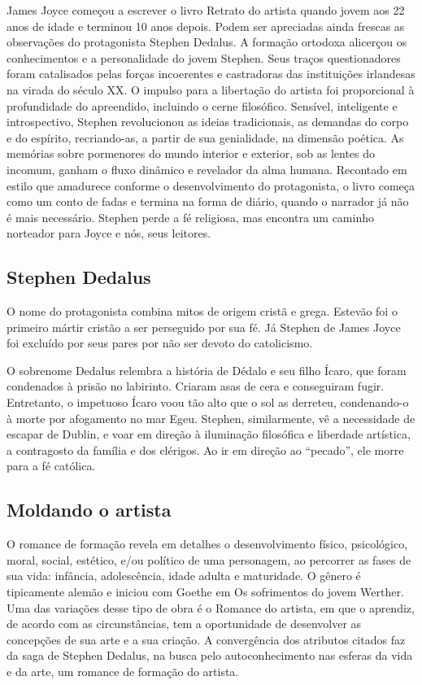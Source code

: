 James Joyce começou a escrever o livro Retrato do artista quando jovem
aos 22 anos de idade e terminou 10 anos depois. Podem ser apreciadas
ainda frescas as observações do protagonista Stephen Dedalus. A formação
ortodoxa alicerçou os conhecimentos e a personalidade do jovem Stephen.
Seus traços questionadores foram catalisados pelas forças incoerentes e
castradoras das instituições irlandesas na virada do século XX. O
impulso para a libertação do artista foi proporcional à profundidade do
apreendido, incluindo o cerne filosófico. Sensível, inteligente e
introspectivo, Stephen revolucionou as ideias tradicionais, as demandas
do corpo e do espírito, recriando-as, a partir de sua genialidade, na
dimensão poética. As memórias sobre pormenores do mundo interior e
exterior, sob as lentes do incomum, ganham o fluxo dinâmico e revelador
da alma humana. Recontado em estilo que amadurece conforme o
desenvolvimento do protagonista, o livro começa como um conto de fadas e
termina na forma de diário, quando o narrador já não é mais necessário.
Stephen perde a fé religiosa, mas encontra um caminho norteador para
Joyce e nós, seus leitores.

\subsection{Stephen Dedalus}

O nome do protagonista combina mitos de origem cristã e grega. Estevão
foi o primeiro mártir cristão a ser perseguido por sua fé. Já Stephen de
James Joyce foi excluído por seus pares por não ser devoto do
catolicismo.

O sobrenome Dedalus relembra a história de Dédalo e seu filho Ícaro, que
foram condenados à prisão no labirinto. Criaram asas de cera e
conseguiram fugir. Entretanto, o impetuoso Ícaro voou tão alto que o sol
as derreteu, condenando-o à morte por afogamento no mar Egeu. Stephen,
similarmente, vê a necessidade de escapar de Dublin, e voar em direção à
iluminação filosófica e liberdade artística, a contragosto da família e
dos clérigos. Ao ir em direção ao ``pecado'', ele morre para a fé
católica.

\subsection{Moldando o artista}

O romance de formação revela em detalhes o desenvolvimento físico,
psicológico, moral, social, estético, e/ou político de uma personagem,
ao percorrer as fases de sua vida: infância, adolescência, idade adulta
e maturidade. O gênero é tipicamente alemão e iniciou com Goethe em Os
sofrimentos do jovem Werther. Uma das variações desse tipo de obra é o
Romance do artista, em que o aprendiz, de acordo com as circunstâncias,
tem a oportunidade de desenvolver as concepções de sua arte e a sua
criação. A convergência dos atributos citados faz da saga de Stephen
Dedalus, na busca pelo autoconhecimento nas esferas da vida e da arte,
um romance de formação do artista.

